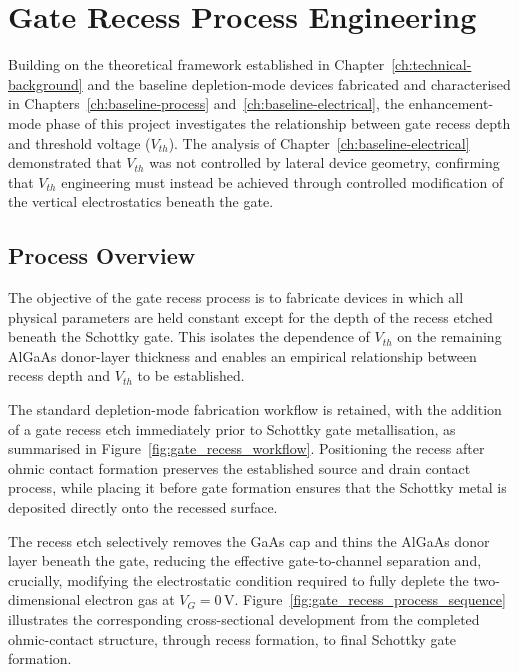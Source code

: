 \chapter{Gate Recess Process Engineering}
\label{ch:gate-recess-process}

Building on the theoretical framework established in
Chapter~\ref{ch:technical-background} and the baseline depletion-mode
devices fabricated and characterised in Chapters~\ref{ch:baseline-process}
and~\ref{ch:baseline-electrical}, the enhancement-mode phase of this
project investigates the relationship between gate recess depth and
threshold voltage ($V_{th}$). The analysis of Chapter~\ref{ch:baseline-electrical} demonstrated that
$V_{th}$ was not controlled by lateral device geometry, confirming
that $V_{th}$ engineering must instead be achieved through
controlled modification of the vertical electrostatics beneath the gate.

\vspace{1mm}

\section{Process Overview}

The objective of the gate recess process is to fabricate devices in which
all physical parameters are held constant except for the depth of the recess
etched beneath the Schottky gate. This isolates the dependence of $V_{th}$ 
on the remaining AlGaAs donor-layer thickness and enables an
empirical relationship between recess depth and $V_{th}$ to be
established.

\vspace{1mm}

The standard depletion-mode fabrication workflow is retained, with the
addition of a gate recess etch immediately prior to Schottky gate
metallisation, as summarised in Figure~\ref{fig:gate_recess_workflow}.
Positioning the recess after ohmic contact formation preserves the established
source and drain contact process, while placing it before gate formation
ensures that the Schottky metal is deposited directly onto the recessed
surface.

\vspace{1mm}




The recess etch selectively removes the GaAs cap and thins the AlGaAs donor
layer beneath the gate, reducing the effective gate-to-channel separation
and, crucially, modifying the electrostatic condition required to fully
deplete the two-dimensional electron gas at $V_G = 0\,\mathrm{V}$.
Figure~\ref{fig:gate_recess_process_sequence} illustrates the corresponding
cross-sectional development from the completed ohmic-contact structure,
through recess formation, to final Schottky gate formation.

